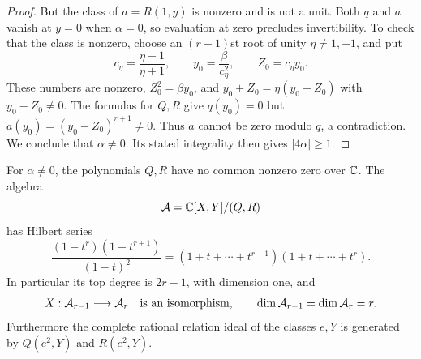 \begin{proof}
But the class of $a=R(1,y)$ is nonzero and is not a unit.  Both $q$ and
$a$ vanish at $y=0$ when $\alpha=0$, so evaluation at zero precludes
invertibility.  To check that the class is nonzero, choose an
$(r+1)$st root of unity $\eta\ne1,-1$, and put
\[
 c_\eta=\frac{\eta-1}{\eta+1},\qquad
 y_0=\frac{\beta}{c_\eta^2},\qquad Z_0=c_\eta y_0.
\]
These numbers are nonzero, $Z_0^2=\beta y_0$, and
$y_0+Z_0=\eta(y_0-Z_0)$ with $y_0-Z_0\ne0$.  The formulas for $Q,R$
give $q(y_0)=0$ but $a(y_0)=(y_0-Z_0)^{r+1}\ne0$.  Thus $a$ cannot
be zero modulo $q$, a contradiction.  We conclude that $\alpha\ne0$.
Its stated integrality then gives $|4\alpha|\ge1$.
\end{proof}

\begin{lemma}
\label{alg:complete-intersection}
For $\alpha\ne0$, the polynomials $Q,R$ have no common nonzero zero
over $\mathbb C$.  The algebra
\[
 \mathcal A=\mathbb C[X,Y]/(Q,R)
\]
has Hilbert series
\begin{equation}
 \frac{(1-t^r)(1-t^{r+1})}{(1-t)^2}
   =(1+t+\cdots+t^{r-1})(1+t+\cdots+t^r).
 \label{alg:hilbert}
\end{equation}
In particular its top degree is $2r-1$, with dimension one, and
\begin{equation}
 X:\mathcal A_{r-1}\longrightarrow\mathcal A_r
 \quad\hbox{is an isomorphism},\qquad
 \dim\mathcal A_{r-1}=\dim\mathcal A_r=r.
 \label{alg:middle-isomorphism}
\end{equation}
Furthermore the complete rational relation ideal of the classes
$e,Y$ is generated by $Q(e^2,Y)$ and $R(e^2,Y)$.
\end{lemma}

